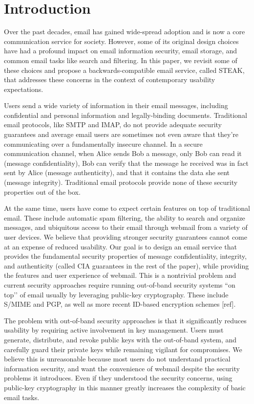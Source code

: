 \section{Introduction}

Over the past decades, email has gained wide-spread adoption 
and is now a core communication service for society. However, 
some of its original design choices have had a profound impact 
on email information security, email storage, and common email 
tasks like search and filtering. In this paper, we revisit some 
of these choices and propose a backwards-compatible email service, 
called STEAK, that addresses these concerns in the context of 
contemporary usability expectations.

Users send a wide variety of information in their email messages, 
including confidential and personal information and legally-binding 
documents. Traditional email protocols, like SMTP and IMAP, do not 
provide adequate security guarantees and average email users are 
sometimes not even aware that they’re communicating over a fundamentally 
insecure channel. In a secure communication channel, when Alice sends 
Bob a message, only Bob can read it (message confidentiality), Bob can 
verify that the message he received was in fact sent by Alice (message 
authenticity), and that it contains the data she sent (message integrity). 
Traditional email protocols provide none of these security properties 
out of the box. 

At the same time, users have come to expect certain features on top of 
traditional email.  These include automatic spam filtering, the ability 
to search and organize messages, and ubiquitous access to their email 
through webmail from a variety of user devices. We believe that providing 
stronger security guarantees cannot come at an expense of reduced usability. 
Our goal is to design an email service that provides the fundamental 
security properties of message confidentiality, integrity, and authenticity 
(called CIA guarantees in the rest of the paper), while providing the 
features and user experience of webmail.  This is a nontrivial problem 
and current security approaches require running out-of-band security 
systems ``on top’’ of email usually by leveraging public-key cryptography. 
These include S/MIME and PGP, as well as more recent ID-based encryption 
schemes [ref].

The problem with out-of-band security approaches is that it significantly 
reduces usability by requiring active involvement in key management. 
Users must generate, distribute, and revoke public keys with the out-of-band 
system, and carefully guard their private keys while remaining vigilant 
for compromises. We believe this is unreasonable because most users do 
not understand practical information security, and want the convenience 
of webmail despite the security problems it introduces. Even if they 
understood the security concerns, using public-key cryptography in this 
manner greatly increases the complexity of basic email tasks. 

